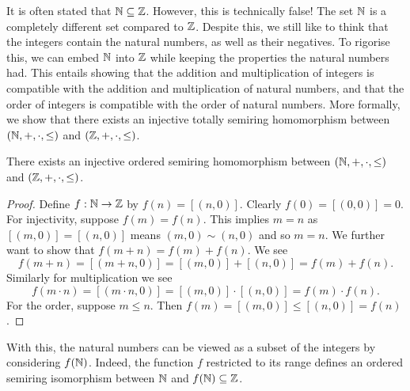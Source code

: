 \documentclass[../main.tex]{subfiles}
\begin{document}
It is often stated that $\mathbb{N}\subseteq\mathbb{Z}$. However, this is technically false! The set $\mathbb{N}$ is a completely different set compared to $\mathbb{Z}$. Despite this, we still like to think that the integers contain the natural numbers, as well as their negatives. To rigorise this, we can embed $\mathbb{N}$ into $\mathbb{Z}$ while keeping the properties the natural numbers had. This entails showing that the addition and multiplication of integers is compatible with the addition and multiplication of natural numbers, and that the order of integers is compatible with the order of natural numbers. More formally, we show that there exists an injective totally semiring homomorphism between $(\mathbb{N},+,\cdot,\leq)$ and $(\mathbb{Z},+,\cdot,\leq)$.
\begin{proposition}\label{prp:the_natural_numbers_integers_and_rational_numbers:embedding_B_in_Z}
    There exists an injective ordered semiring homomorphism between $(\mathbb{N},+,\cdot,\leq)$ and $(\mathbb{Z},+,\cdot,\leq)$.
\end{proposition}
\begin{proof}
    Define $f:\mathbb{N}\to\mathbb{Z}$ by $f(n)=[(n,0)]$. Clearly $f(0)=[(0,0)]=0$. For injectivity, suppose $f(m)=f(n)$. This implies $m=n$ as $[(m,0)]=[(n,0)]$ means $(m,0)\sim(n,0)$ and so $m=n$. We further want to show that $f(m+n)=f(m)+f(n)$. We see
    \begin{equation*}
        f(m+n)=[(m+n,0)]=[(m,0)]+[(n,0)]=f(m)+f(n).
    \end{equation*}
    Similarly for multiplication we see
    \begin{equation*}
        f(m\cdot n)=[(m\cdot n,0)]=[(m,0)]\cdot[(n,0)]=f(m)\cdot f(n).
    \end{equation*}
    For the order, suppose $m\leq n$. Then $f(m)=[(m,0)]\leq[(n,0)]=f(n)$.
\end{proof}
With this, the natural numbers can be viewed as a subset of the integers by considering $f(\mathbb{N})$. Indeed, the function $f$ restricted to its range defines an ordered semiring isomorphism between $\mathbb{N}$ and $f(\mathbb{N})\subseteq\mathbb{Z}$.
\end{document}
